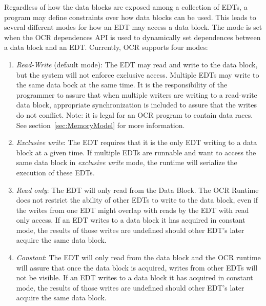 Regardless of how the data blocks are exposed among a collection of
EDTs, a program may define constraints over how data
blocks can be used.  This leads to several different modes for how an
EDT may access a data block.  The mode is set when the OCR dependences
API is used to dynamically set dependences between a data block and an
EDT. Currently, OCR supports four modes:
\begin{enumerate}

\item \emph{Read-Write} (default mode): The EDT may read
and write to the data block, but the system will not enforce exclusive access.  Multiple EDTs may
write to the same data bock at the same time.   It is the responsibility of the programmer to
assure that when multiple writers are writing to a read-write data block,
appropriate synchronization
is included to assure that the writes do not conflict.  Note: it is legal for an OCR program
to contain data races.  See section~\ref{sec:MemoryModel} for more information.

\item \emph{Exclusive write}: The
EDT requires that it is the only EDT writing to a data block at a
given time. If multiple EDTs are runnable and want to access the same
data block in \emph{exclusive write} mode, the runtime will serialize
the execution of these EDTs.

\item \emph{Read only}: The EDT
will only read from the Data Block. The OCR Runtime does
not restrict the ability of other EDTs to write to the data block,
even if the writes from one EDT might overlap with reads by the EDT
with read only access.   If an EDT writes to a data block
it has acquired in constant mode,
the results of those writes are undefined should other EDT's later acquire the same data block.

\item \emph{Constant}: The EDT will only read from the
data block and the OCR runtime will assure that once the data block is acquired,
writes from other EDTs will not be visible.  If an EDT writes to a data block
it has acquired in constant mode,
the results of those writes are undefined should other EDT's later acquire the same data block.
\end{enumerate}


